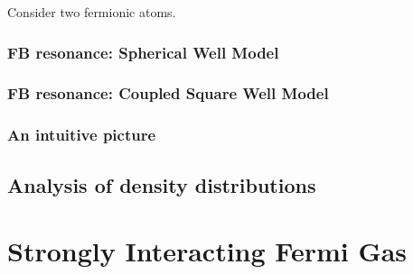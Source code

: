 \documentclass{book}
\theoremstyle{definition}
\begin{document}
Consider two fermionic atoms. 


\subsection{FB resonance: Spherical Well Model}

\subsection{FB resonance: Coupled Square Well Model}

\subsection{An intuitive picture}




\section{Analysis of density distributions}













\chapter{Strongly Interacting Fermi Gas}


 




	
	
\end{document}

